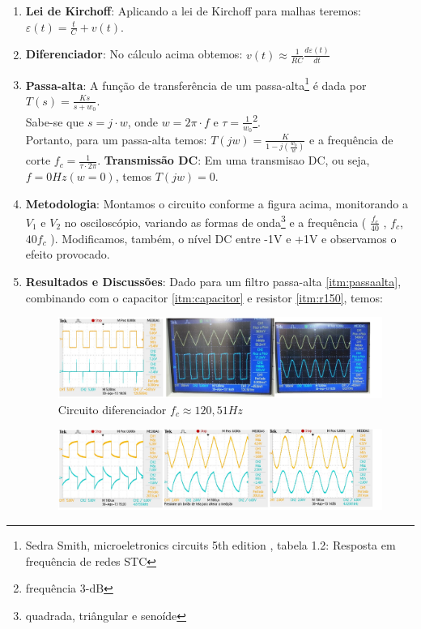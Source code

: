\documentclass[12pt,letterpaper]{article}
\begin{document}
\begin{enumerate}[I]
\item \textbf{Lei de Kirchoff}: Aplicando a lei de Kirchoff para malhas teremos: $\varepsilon(t) = \frac{t}{C} + v(t)$.
\item \textbf{Diferenciador}: No cálculo acima obtemos: $v(t) \approx \frac{1}{RC}\frac{d\varepsilon(t)}{dt}$
\item \label{itm:passaalta} \textbf{Passa-alta}: A função de transferência de um passa-alta\footnote{Sedra Smith, microeletronics circuits 5th edition , tabela 1.2: Resposta em frequência de redes STC} é dada por $T(s) = \frac{Ks}{s + w_0}$.\\
  Sabe-se que $s = j \cdot w$, onde $w = 2\pi \cdot f$ e $\tau = \frac{1}{w_0}$\footnote{frequência 3-dB}.\\
Portanto, para um passa-alta temos: $T(jw) = \frac{K}{1 - j(\frac{w_0}{w})}$ e a frequência de corte $f_c = \frac{1}{\tau \cdot 2\pi}$.
\subitem \label{itm:intdc} \textbf{Transmissão DC}: Em uma transmisao DC, ou seja, $f = 0Hz (w = 0)$, temos $T(jw) = 0$.
\item \textbf{Metodologia}: Montamos o circuito conforme a figura acima, monitorando a $V_1$ e $V_2$ no osciloscópio, variando as formas de onda\footnote{quadrada, triângular e senoíde} e a frequência ( $\frac{f_c}{40}$ , $f_c$, $40f_c$ ). Modificamos, também, o nível DC entre -1V e +1V e observamos o efeito provocado.
\item \label{itm:intred} \textbf{Resultados e Discussões}: Dado para um filtro passa-alta \ref{itm:passaalta}, combinando com o capacitor \ref{itm:capacitor} e resistor \ref{itm:r150}, temos:
\begin{figure}[!htb]
  \centering
  \label{fd40d}
  \includegraphics[scale=0.62]{img/fd40d.jpg}
  \caption{Circuito diferenciador $f_c \approx 120,51Hz$}
\end{figure}
\begin{figure}[!htb]
  \centering
  \label{fd}
  \includegraphics[scale=0.62]{img/fd.jpg}

\end{figure}
\end{enumerate}
\end{document}
